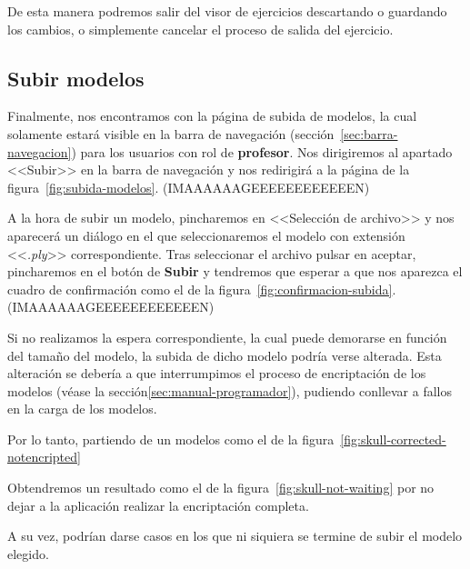 De esta manera podremos salir del visor de ejercicios descartando o guardando los cambios, o simplemente cancelar el proceso de salida del ejercicio.

\subsection{Subir modelos}\label{sec:subir-modelos}
Finalmente, nos encontramos con la página de subida de modelos, la cual solamente estará visible en la barra de navegación (sección~\ref{sec:barra-navegacion}) para los usuarios con rol de \textbf{profesor}. Nos dirigiremos al apartado <<Subir>> en la barra de navegación y nos redirigirá a la página de la figura~\ref{fig:subida-modelos}.
(IMAAAAAAGEEEEEEEEEEEEN)

A la hora de subir un modelo, pincharemos en <<Selección de archivo>> y nos aparecerá un diálogo en el que seleccionaremos el modelo con extensión <<\textit{.ply}>> correspondiente. Tras seleccionar el archivo pulsar en aceptar, pincharemos en el botón de \textbf{Subir} y tendremos que esperar a que nos aparezca el cuadro de confirmación como el de la figura~\ref{fig:confirmacion-subida}.
(IMAAAAAAGEEEEEEEEEEEEN)

Si no realizamos la espera correspondiente, la cual puede demorarse en función del tamaño del modelo, la subida de dicho modelo podría verse alterada. Esta alteración se debería a que interrumpimos el proceso de encriptación de los modelos (véase la sección\ref{sec:manual-programador}), pudiendo conllevar a fallos en la carga de los modelos.

Por lo tanto, partiendo de un modelos como el de la figura~\ref{fig:skull-corrected-notencripted}

Obtendremos un resultado como el de la figura~\ref{fig:skull-not-waiting} por no dejar a la aplicación realizar la encriptación completa.

A su vez, podrían darse casos en los que ni siquiera se termine de subir el modelo elegido.